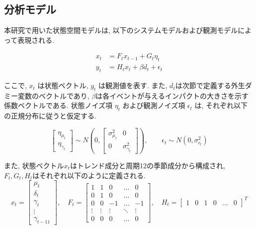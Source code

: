 \documentclass[a4paper, 10pt]{jarticle}
\begin{document}
\subsection{分析モデル}
\indent 本研究で用いた状態空間モデルは, 以下のシステムモデルおよび観測モデルによって表現される. 

\begin{align}
    x_t &= F_t x_{t-1} + G_t \eta_{t} \label{eq:system_model} \\
    y_t &= H_t x_t + \beta d_t + \epsilon_t \label{eq:observation_model}
\end{align}

ここで, $x_{t}$ は状態ベクトル, $y_{t}$ は観測値を表す. 
また, $d_t$は次節で定義する外生ダミー変数のベクトルであり, $\beta$は各イベントが与えるインパクトの大きさを示す係数ベクトルである. 
状態ノイズ項 $\eta_t$ および観測ノイズ項 $\epsilon_t$ は, それぞれ以下の正規分布に従うと仮定する. 

\begin{equation}
    \begin{bmatrix}
        \eta_{\mu_{t}}  \\
        \eta_{\gamma_{t}}
    \end{bmatrix}
    \sim N \left( 0, 
    \begin{bmatrix}
        \sigma_{\mu_{t}}^2 & 0  \\
        0 & \sigma_{\gamma_{t}}^2
    \end{bmatrix} \right)
    ,
    \qquad %
    \epsilon_t \sim N( 0, \sigma_{\epsilon_{t}}^2)
    \label{eq:dist_combined} %
\end{equation}

また, 状態ベクトル$x_t$はトレンド成分と周期12の季節成分から構成され, $F_t, G_t, H_t$はそれぞれ以下のように定義される.
\begin{equation}
    x_t = 
    \begin{bmatrix}
        \mu_t \\
        \delta_t \\
        \gamma_t \\
        \vdots \\
        \gamma_{t-11}
    \end{bmatrix}
    , \quad
    F_t = 
    \begin{bmatrix}
        1 & 1 & 0 & \dots & 0 \\
        0 & 1 & 0 & \dots & 0 \\
        0 & 0 & -1 & \dots & -1 \\
        \vdots & \vdots & \vdots & \ddots & \vdots \\
        0 & 0 & 0 & \dots & 0
    \end{bmatrix}
    , \quad
    H_t = 
    \begin{bmatrix}
        1 & 0 & 1 & 0 & \dots & 0
    \end{bmatrix}^T
\end{equation}
\end{document}
